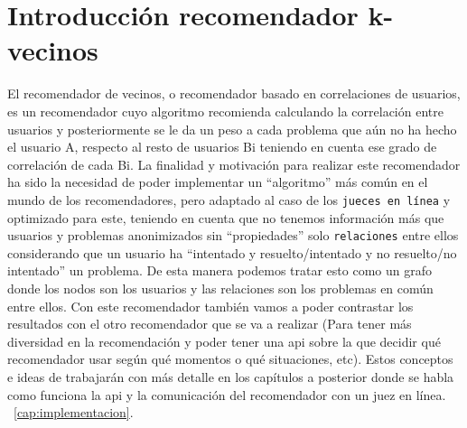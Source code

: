 \section{Introducción recomendador k-vecinos}
\label{cap3:sec:introduccion}

El recomendador de vecinos, o recomendador basado en correlaciones de usuarios, es un recomendador cuyo algoritmo recomienda calculando la correlación entre usuarios y posteriormente se le da un peso a cada problema que aún no ha hecho el usuario A, respecto al resto de usuarios Bi teniendo en cuenta ese grado de correlación de cada Bi. La finalidad y motivación para realizar este recomendador ha sido la necesidad de poder implementar un “algoritmo” más común en el mundo de los recomendadores, pero adaptado al caso de los \texttt{jueces en línea} y optimizado para este, teniendo en cuenta que no tenemos información más que usuarios y problemas anonimizados sin “propiedades” solo \texttt{relaciones} entre ellos considerando que un usuario ha “intentado y resuelto/intentado y no resuelto/no intentado”  un problema. De esta manera podemos tratar esto como un grafo donde los nodos son los usuarios y las relaciones son los problemas en común entre ellos. Con este recomendador también vamos a poder contrastar los resultados con el otro recomendador que se va a realizar (Para tener más diversidad en la recomendación y poder tener una api sobre la que decidir qué recomendador usar según qué momentos o qué situaciones, etc). Estos conceptos e ideas de trabajarán con más detalle en los capítulos a posterior donde se habla como funciona la api y la comunicación del recomendador con un juez en línea. ~\ref{cap:implementacion}.

